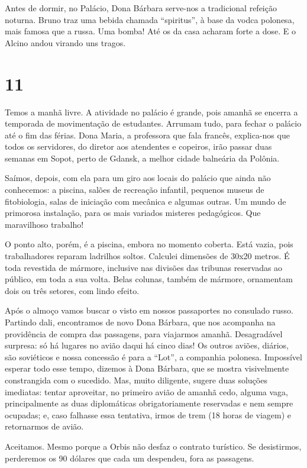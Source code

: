 Antes de dormir, no Palácio, Dona Bárbara serve-nos a tradicional refeição noturna. Bruno traz uma bebida chamada ``spiritus'', à base da vodca polonesa, mais famosa que a russa. Uma bomba! Até os da casa acharam forte a dose. E o Alcino andou virando uns tragos.

\section*{11 \adfflatleafright {}}
Temos a manhã livre. A atividade no palácio é grande, pois amanhã se encerra a temporada de movimentação de estudantes. Arrumam tudo, para fechar o palácio até o fim das férias. Dona Maria, a professora que fala francês, explica-nos que todos os servidores, do diretor aos atendentes e copeiros, irão passar duas semanas em Sopot, perto de Gdansk, a melhor cidade balneária da Polônia.

Saímos, depois, com ela para um giro aos locais do palácio que ainda não conhecemos: a piscina, salões de recreação infantil, pequenos museus de fitobiologia, salas de iniciação com mecânica e algumas outras. Um mundo de primorosa instalação, para os mais variados misteres pedagógicos. Que maravilhoso trabalho!

O ponto alto, porém, é a piscina, embora no momento coberta. Está vazia, pois trabalhadores reparam ladrilhos soltos. Calculei dimensões de 30x20 metros. É toda revestida de mármore, inclusive nas divisões das tribunas reservadas ao público, em toda a sua volta. Belas colunas, também de mármore, ornamentam dois ou três setores, com lindo efeito.

Após o almoço vamos buscar o visto em nossos passaportes no consulado russo. Partindo dali, encontramos de novo Dona Bárbara, que nos acompanha na providência de compra das passagens, para viajarmos amanhã. Desagradável surpresa: só há lugares no avião daqui há cinco dias! Os outros aviões, diários, são soviéticos e nossa concessão é para a ``Lot'', a companhia polonesa. Impossível esperar todo esse tempo, dizemos à Dona Bárbara, que se mostra visivelmente constrangida com o sucedido. Mas, muito diligente, sugere duas soluções imediatas: tentar aproveitar, no primeiro avião de amanhã cedo, alguma vaga, principalmente as duas diplomáticas obrigatoriamente reservadas e nem sempre ocupadas; e, caso falhasse essa tentativa, irmos de trem (18 horas de viagem) e retornarmos de avião.

Aceitamos. Mesmo porque a Orbis não desfaz o contrato turístico. Se desistirmos, perderemos os 90 dólares que cada um despendeu, fora as passagens.

